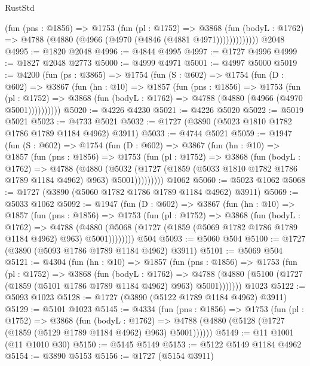\begin{lexlean}{RustStd}
\begin{coremodule}
              (fun (pns : @1856) =>
              @1753
                (fun (pl : @1752) =>
                @3868
                  (fun (bodyL : @1762) =>
                  @4788 (@4880 (@4966 (@4970 (@4846 (@4881 @4971)))))))))))))
    @2048
@4995 := @1820 @2048
@4996 := @4844 @4995
@4997 := @1727 @4996
@4999 := @1827 @2048 @2773
@5000 := @4999 @4971
@5001 := @4997 @5000
@5019 := @4200
    (fun (ps : @3865) =>
    @1754
      (fun (S : @602) =>
      @1754
        (fun (D : @602) =>
        @3867
          (fun (hn : @10) =>
          @1857
            (fun (pns : @1856) =>
            @1753
              (fun (pl : @1752) =>
              @3868 (fun (bodyL : @1762) => @4788 (@4880 (@4966 (@4970 @5001))))))))))
@5020 := @4226 @4230
@5021 := @4226 @5020
@5022 := @5019 @5021
@5023 := @4733 @5021
@5032 := @1727 (@3890 (@5023 @1810 @1782 @1786 @1789 @1184 @4962) @3911)
@5033 := @4744 @5021
@5059 := @1947
    (fun (S : @602) =>
    @1754
      (fun (D : @602) =>
      @3867
        (fun (hn : @10) =>
        @1857
          (fun (pns : @1856) =>
          @1753
            (fun (pl : @1752) =>
            @3868
              (fun (bodyL : @1762) =>
              @4788
                (@4880
                  (@5032
                    (@1727 (@1859 (@5033 @1810 @1782 @1786 @1789 @1184 @4962) @963) @5001)))))))))
    @1062
@5060 := @5023 @1062
@5068 := @1727 (@3890 (@5060 @1782 @1786 @1789 @1184 @4962) @3911)
@5069 := @5033 @1062
@5092 := @1947
    (fun (D : @602) =>
    @3867
      (fun (hn : @10) =>
      @1857
        (fun (pns : @1856) =>
        @1753
          (fun (pl : @1752) =>
          @3868
            (fun (bodyL : @1762) =>
            @4788
              (@4880 (@5068 (@1727 (@1859 (@5069 @1782 @1786 @1789 @1184 @4962) @963) @5001))))))))
    @504
@5093 := @5060 @504
@5100 := @1727 (@3890 (@5093 @1786 @1789 @1184 @4962) @3911)
@5101 := @5069 @504
@5121 := @4304
    (fun (hn : @10) =>
    @1857
      (fun (pns : @1856) =>
      @1753
        (fun (pl : @1752) =>
        @3868
          (fun (bodyL : @1762) =>
          @4788 (@4880 (@5100 (@1727 (@1859 (@5101 @1786 @1789 @1184 @4962) @963) @5001)))))))
    @1023
@5122 := @5093 @1023
@5128 := @1727 (@3890 (@5122 @1789 @1184 @4962) @3911)
@5129 := @5101 @1023
@5145 := @4334
    (fun (pns : @1856) =>
    @1753
      (fun (pl : @1752) =>
      @3868
        (fun (bodyL : @1762) =>
        @4788 (@4880 (@5128 (@1727 (@1859 (@5129 @1789 @1184 @4962) @963) @5001))))))
@5149 := @11 @1001 (@11 @1010 @30)
@5150 := @5145 @5149
@5153 := @5122 @5149 @1184 @4962
@5154 := @3890 @5153
@5156 := @1727 (@5154 @3911)

\end{coremodule}
\end{lexlean}

